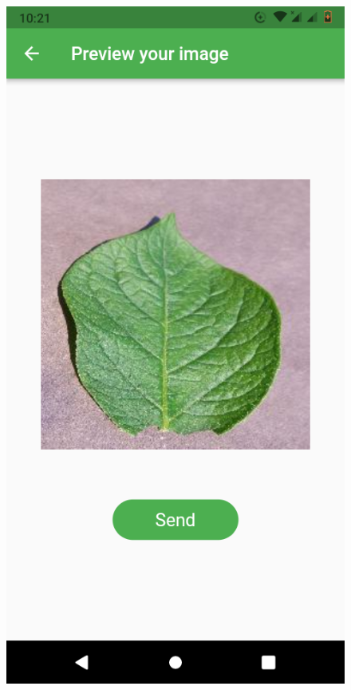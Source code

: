 \documentclass[11pt]{report}
\begin{document}
\begin{figure}[h]
	\centerline{\small 
		\includegraphics[height=0.20\textheight]  {h1}}
\end{figure}
\end{document}
